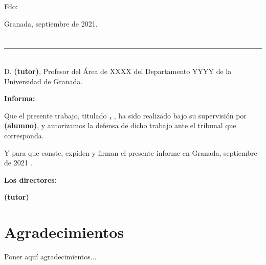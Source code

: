 \vspace{6cm}

\noindent Fdo: \myName

\vspace{2cm}

\begin{flushright}
Granada, septiembre de 2021.
\end{flushright}


\chapter*{}
\thispagestyle{empty}

\noindent\rule[-1ex]{\textwidth}{2pt}\\[4.5ex]

D. \textbf{\myProf  (tutor)}, Profesor del Área de XXXX del Departamento YYYY de la Universidad de Granada.

\vspace{0.5cm}

\textbf{Informa:}

\vspace{0.5cm}

Que el presente trabajo, titulado \textit{\textbf{\myTitle, \mySubtitle}},
ha sido realizado bajo su supervisión por \textbf{\myName (alumno)}, y autorizamos la defensa de dicho trabajo ante el tribunal
que corresponda.

\vspace{0.5cm}

Y para que conste, expiden y firman el presente informe en Granada, septiembre de 2021 .

\vspace{1cm}

\textbf{Los directores:}

\vspace{5cm}

\noindent \textbf{\myProf (tutor)}

\chapter*{Agradecimientos}
\thispagestyle{empty}

       \vspace{1cm}


Poner aquí agradecimientos...


